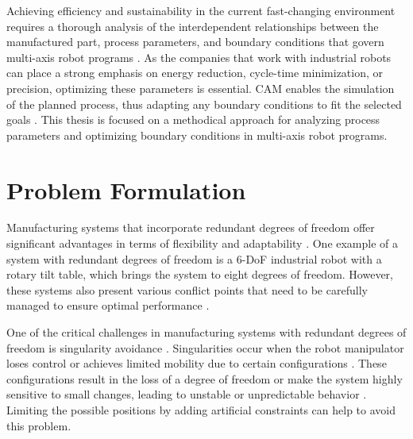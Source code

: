 Achieving efficiency and sustainability in the current fast-changing environment requires a thorough analysis of the interdependent relationships between the manufactured part, process parameters, and boundary conditions that govern multi-axis robot programs \cite{Pan}. As the companies that work with industrial robots can place a strong emphasis on energy reduction, cycle-time minimization, or precision, optimizing these parameters is essential. CAM enables the simulation of the planned process, thus adapting any boundary conditions to fit the selected goals \cite{Kyratsis.2020,Maiti.2017,Pan}.
This thesis is focused on a methodical approach for analyzing process parameters and optimizing boundary conditions in multi-axis robot programs. 

\section{Problem Formulation}\label{Problem Formulation}
Manufacturing systems that incorporate redundant degrees of freedom offer significant advantages in terms of flexibility and adaptability \cite{Anjum.2022}. One example of a system with redundant degrees of freedom is a 6-DoF industrial robot with a rotary tilt table, which brings the system to eight degrees of freedom. However, these systems also present various conflict points that need to be carefully managed to ensure optimal performance \cite{Boscariol.2020, Liu.2022}.


One of the critical challenges in manufacturing systems with redundant degrees of freedom is singularity avoidance \cite{Liu.2022}. Singularities occur when the robot manipulator loses control or achieves limited mobility due to certain configurations \cite{Malyshev.2022}. These configurations result in the loss of a degree of freedom or make the system highly sensitive to small changes, leading to unstable or unpredictable behavior \cite{Zhao.2021}. Limiting the possible positions by adding artificial constraints can help to avoid this problem. %


